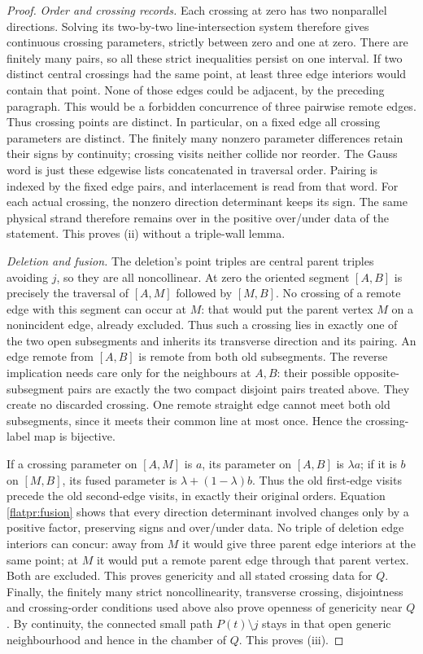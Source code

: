 \begin{proof}
\emph{Order and crossing records.}
Each crossing at zero has two nonparallel directions. Solving its
two-by-two line-intersection system therefore gives continuous crossing
parameters, strictly between zero and one at zero. There are finitely
many pairs, so all these strict inequalities persist on one interval.
If two distinct central crossings had the same point, at least three
edge interiors would contain that point. None of those edges could be
adjacent, by the preceding paragraph. This would be a forbidden
concurrence of three pairwise remote edges. Thus crossing points are
distinct. In particular, on a fixed edge all crossing parameters are
distinct. The finitely many nonzero parameter differences retain their
signs by continuity; crossing visits neither collide nor reorder.
The Gauss word is just these edgewise lists concatenated in traversal
order. Pairing is indexed by the fixed edge pairs, and interlacement is
read from that word. For each actual crossing, the nonzero direction
determinant keeps its sign. The same physical strand therefore remains
over in the positive over/under data of the statement. This proves (ii)
without a triple-wall lemma.

\emph{Deletion and fusion.}
The deletion's point triples are central parent triples avoiding $j$,
so they are all noncollinear. At zero the oriented segment $[A,B]$
is precisely the traversal of $[A,M]$ followed by $[M,B]$.
No crossing of a remote edge with this segment can occur at $M$:
that would put the parent vertex $M$ on a nonincident edge, already
excluded. Thus such a crossing lies in exactly one of the two open
subsegments and inherits its transverse direction and its pairing.
An edge remote from $[A,B]$ is remote from both old subsegments.
The reverse implication needs care only for the neighbours at $A,B$:
their possible opposite-subsegment pairs are exactly the two compact
disjoint pairs treated above. They create no discarded crossing.
One remote straight edge cannot meet both old subsegments, since it
meets their common line at most once. Hence the crossing-label map is
bijective.

If a crossing parameter on $[A,M]$ is $a$, its parameter on $[A,B]$
is $\lambda a$; if it is $b$ on $[M,B]$, its fused parameter is
$\lambda+(1-\lambda)b$. Thus the old first-edge visits precede the
old second-edge visits, in exactly their original orders. Equation
\eqref{flatpr:fusion} shows that every direction determinant involved
changes only by a positive factor, preserving signs and over/under
data. No triple of deletion edge interiors can concur: away from $M$
it would give three parent edge interiors at the same point; at $M$
it would put a remote parent edge through that parent vertex. Both
are excluded. This proves genericity and all stated crossing data for
$Q$. Finally, the finitely many strict noncollinearity, transverse
crossing, disjointness and crossing-order conditions used above also
prove openness of genericity near $Q$. By continuity, the connected
small path $P(t)\setminus j$ stays in that open generic neighbourhood
and hence in the chamber of $Q$. This proves (iii).
\end{proof}

